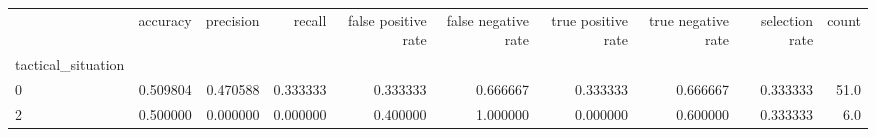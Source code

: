 \begin{tabular}{lrrrrrrrrr}
\toprule
{} &  accuracy &  precision &    recall &  false positive rate &  false negative rate &  true positive rate &  true negative rate &  selection rate &  count \\
tactical\_situation &           &            &           &                      &                      &                     &                     &                 &        \\
\midrule
0                  &  0.509804 &   0.470588 &  0.333333 &             0.333333 &             0.666667 &            0.333333 &            0.666667 &        0.333333 &   51.0 \\
2                  &  0.500000 &   0.000000 &  0.000000 &             0.400000 &             1.000000 &            0.000000 &            0.600000 &        0.333333 &    6.0 \\
\bottomrule
\end{tabular}
